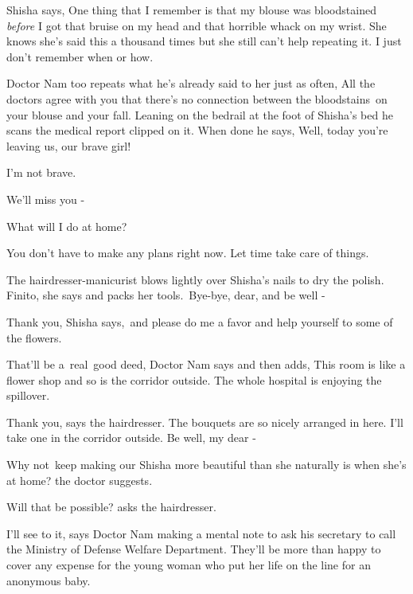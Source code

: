\documentclass[twoside,11pt]{book}
\begin{document}
Shisha says, {\textquotedbl}One thing that I remember is that my blouse was bloodstained \textit{before} I got that
bruise on my head and that horrible whack on my wrist.{\textquotedbl} She knows she's said this a thousand times but
she still can't help repeating it. {\textquotedbl}I just don't remember when or how.{\textquotedbl} 

Doctor Nam too repeats what he's already said to her just as often, {\textquotedbl}All the doctors agree with you that
there's no connection between the bloodstains~on your blouse and your fall.{\textquotedbl} Leaning on the bedrail at
the foot of Shisha's bed he scans the medical report clipped on it. When done he says, {\textquotedbl}Well, today
you're leaving us, our brave girl!{\textquotedbl} 

{\textquotedbl}I'm not brave.{\textquotedbl} 

{\textquotedbl}We'll miss you -{\textquotedbl} 

{\textquotedbl}What will I do at home?{\textquotedbl} 

{\textquotedbl}You don't have to make any plans right now. Let time take care of things.{\textquotedbl} 

The hairdresser-manicurist blows lightly over Shisha's nails to dry the polish. {\textquotedbl}Finito,{\textquotedbl}
she says and packs her tools.~{\textquotedbl}Bye-bye, dear, and be well -{\textquotedbl} ~

{\textquotedbl}Thank you,{\textquotedbl} Shisha says,~{\textquotedbl}and please do me a favor and help yourself to some
of the flowers.{\textquotedbl} 

{\textquotedbl}That'll be a\ real\ good deed,{\textquotedbl} Doctor Nam says and then adds, {\textquotedbl}This room is
like a flower shop and so is the corridor outside. The whole hospital is enjoying the spillover.{\textquotedbl}

{\textquotedbl}Thank you,{\textquotedbl} says the hairdresser. {\textquotedbl}The bouquets are so nicely arranged in
here. I'll take one in the corridor outside. Be well, my dear -{\textquotedbl} 

{\textquotedbl}Why not~keep making our Shisha more beautiful than she naturally is when she's at home?{\textquotedbl}
the doctor suggests. 

{\textquotedbl}Will that be possible?{\textquotedbl} asks the hairdresser. 

{\textquotedbl}I'll see to it,{\textquotedbl} says Doctor Nam making a mental note to ask his secretary to call the
Ministry of Defense Welfare Department. They'll be more than happy to cover any expense for the young woman who put her
life on the line for an anonymous baby.
\end{document}
